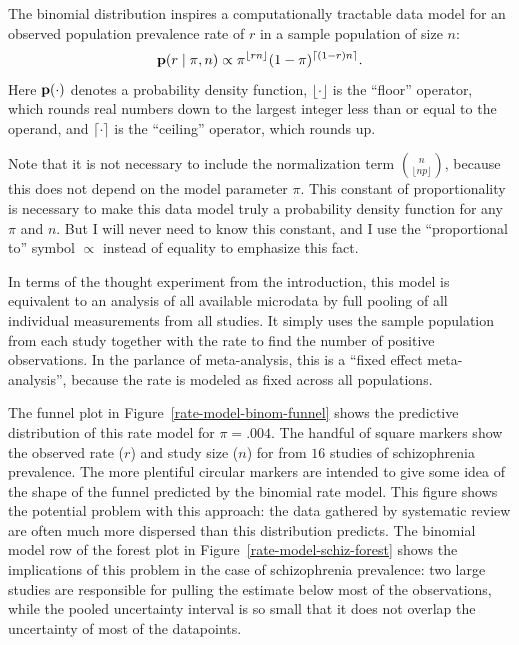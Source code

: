 The binomial distribution inspires a computationally tractable
data model for an observed population prevalence rate of
$r$ in a sample population of size $n$:
\[
\mathbf{p}(r\;|\; \pi, n) \propto \pi^{\lfloor rn \rfloor}(1-\pi)^{\lceil (1-r)n \rceil}.
\]
Here $\mathbf{p}(\cdot)$ denotes a probability density function, $\lfloor
\cdot \rfloor$ is the ``floor'' operator, which rounds real numbers
down to the largest integer less than or equal to the operand, and
$\lceil \cdot \rceil$ is the ``ceiling'' operator, which rounds up.

Note that it is not necessary to include the normalization term
$\binom{n}{\lfloor np\rfloor}$, because this does not depend on the
model parameter $\pi$. This constant of proportionality is necessary
to make this data model truly a probability density function for any
$\pi$ and $n$. But I will never need to know this constant, and I use
the ``proportional to'' symbol $\propto$ instead of equality to
emphasize this fact.

In terms of the thought experiment from the introduction, this model
is equivalent to an analysis of all available microdata by full
pooling of all individual measurements from all studies.  It simply
uses the sample population from each study together with the rate to
find the number of positive observations.  In the parlance of
meta-analysis, this is a ``fixed effect meta-analysis'', because the
rate is modeled as fixed across all populations.\cite{Borenstein_Introduction_2011}

The funnel plot in Figure~\ref{rate-model-binom-funnel} shows the
predictive distribution of this rate model for $\pi=.004$.  The
handful of square markers show the observed rate ($r$) and study size
($n$) for from $16$ studies of schizophrenia prevalence. The more
plentiful circular markers are intended to give some idea of the shape
of the funnel predicted by the binomial rate model.  This figure shows
the potential problem with this approach: the data gathered by
systematic review are often much more dispersed than this distribution
predicts.  The binomial model row of the forest plot in
Figure~\ref{rate-model-schiz-forest} shows the implications of this
problem in the case of schizophrenia prevalence: two large studies are
responsible for pulling the estimate below most of the observations,
while the pooled uncertainty interval is so small that it does not
overlap the uncertainty of most of the datapoints.
 

